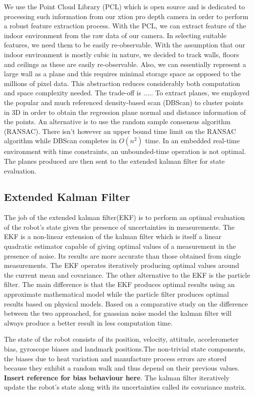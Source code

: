 \documentclass[]{article}
\begin{document}
{We use the Point Cloud Library (PCL) which is open source and is dedicated to processing such information from our xtion pro depth camera in order to perform a robust feature extraction process. With the PCL, we can extract feature of the indoor environment from the raw data of our camera. In selecting suitable features, we need them to be easily re-observable. With the assumption that our indoor environment is mostly cubic in nature, we decided to track walls, floors and ceilings as these are easily re-observable. Also, we can essentially represent a large wall as a plane and this requires minimal storage space as opposed to the millions of pixel data. This abstraction reduces considerably both computation and space complexity needed. The trade-off is .....
To extract planes, we employed the popular and much referenced density-based scan (DBScan) to cluster points in 3D in order to obtain the regression plane normal and distance information of the points. An alternative is to use the random sample consensus algorithm (RANSAC). There isn't however an upper bound time limit on the RANSAC algorithm while DBScan completes in $O(n^{2})$ time. In an embedded real-time environment with time constraints, an unbounded-time operation is not optimal. The planes produced are then sent to the extended kalman filter for state evaluation.

\subsection{Extended Kalman Filter}
The job of the extended kalman filter(EKF) is to perform an optimal evaluation of the robot's state given the presence of uncertainties in measurements. The EKF is a non-linear extension of the kalman filter which is itself a linear quadratic estimator capable of giving optimal values of a measurement in the presence of noise. Its results are more accurate than those obtained from single measurements. The EKF operates iteratively producing optimal values around the current mean and covariance. The other alternative to the EKF is the particle filter. The main difference is that the EKF produces optimal results using an approximate mathematical model while the particle filter produces optimal results based on physical models.
\cite{CompareFilters}Based on a comparative study on the difference between the two approached, for guassian noise model the kalman filter will always produce a better result in less computation time.

The state of the robot consists of its position, velocity, attitude, accelerometer bias, gyroscope biases  and landmark positions.The non-trivial state components, the biases due to heat variation and manufacture process errors are stored because they exhibit a random walk and thus depend on their previous values. \textbf{Insert reference for bias behaviour here}. The kalman filter iteratively update the robot's state along with its uncertainties called its covariance matrix.

}
\end{document}
